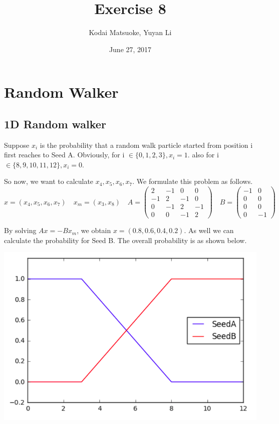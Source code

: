 \documentclass[12pt,a4paper]{scrartcl}
\author{Kodai Matsuoke, Yuyan Li}
\title{Exercise 8}
\date{June 27, 2017}
\begin{document}
\maketitle


\section{Random Walker}

\subsection{1D Random walker}

Suppose \(x_{i}\) is the probability that a random walk particle started from position i first reaches to Seed A.
Obviously, for i \(\in \{0,1,2,3\}, x_{i}=1\). also for i \(\in \{8,9,10,11,12\}, x_{i}=0\).


So now, we want to calculate \(x_{4},x_{5},x_{6},x_{7}\). We formulate this problem as follows.
\[
x = (x_{4},x_{5},x_{6},x_{7})
\quad
x_{m} = (x_{3},x_{8})
\quad
A = 
\left(
\begin{array}{cccc}
	2 & -1 & 0 & 0
	\\
	-1 & 2 & -1 & 0
	\\
	0 & -1 & 2 & -1
	\\
	0 & 0 & -1 & 2
\end{array}
\right)
\quad
B = 
\left(
\begin{array}{cc}
	-1 & 0
	\\
	0 & 0
	\\
	0 & 0
	\\
	0 & -1
\end{array}
\right)
\]

By solving \(Ax = -Bx_{m}\), we obtain \(x = (0.8, 0.6, 0.4, 0.2)\). As well we can calculate the probability for Seed B.
The overall probability is as shown below.

\includegraphics[scale = 0.4]{1_1.png}
\end{document}
